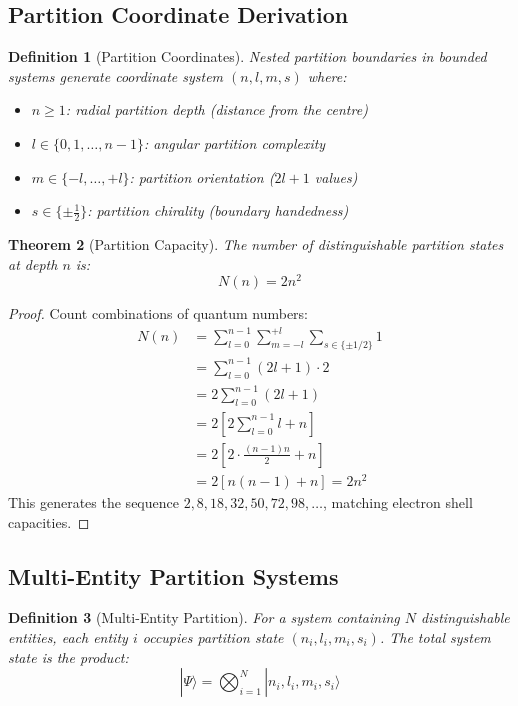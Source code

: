 \documentclass[11pt,a4paper]{article}
\newtheorem{theorem}{Theorem}[section]
\newtheorem{definition}[theorem]{Definition}
\theoremstyle{remark}
\begin{document}
\subsection{Partition Coordinate Derivation}

\begin{definition}[Partition Coordinates]
\label{def:partition_coords}
Nested partition boundaries in bounded systems generate coordinate system $(n, l, m, s)$ where:
\begin{itemize}
\item $n \geq 1$: radial partition depth (distance from the centre)
\item $l \in \{0, 1, \ldots, n-1\}$: angular partition complexity
\item $m \in \{-l, \ldots, +l\}$: partition orientation ($2l+1$ values)
\item $s \in \{\pm\frac{1}{2}\}$: partition chirality (boundary handedness)
\end{itemize}
\end{definition}

\begin{theorem}[Partition Capacity]
\label{thm:partition_capacity}
The number of distinguishable partition states at depth $n$ is:
\begin{equation}
N(n) = 2n^2
\end{equation}
\end{theorem}

\begin{proof}
Count combinations of quantum numbers:
\begin{align}
N(n) &= \sum_{l=0}^{n-1} \sum_{m=-l}^{+l} \sum_{s \in \{\pm 1/2\}} 1 \\
&= \sum_{l=0}^{n-1} (2l+1) \cdot 2 \\
&= 2\sum_{l=0}^{n-1} (2l+1) \\
&= 2\left[2\sum_{l=0}^{n-1} l + n\right] \\
&= 2\left[2 \cdot \frac{(n-1)n}{2} + n\right] \\
&= 2[n(n-1) + n] = 2n^2
\end{align}
This generates the sequence $2, 8, 18, 32, 50, 72, 98, \ldots$, matching electron shell capacities.
\end{proof}

\subsection{Multi-Entity Partition Systems}

\begin{definition}[Multi-Entity Partition]
\label{def:multi_entity}
For a system containing $N$ distinguishable entities, each entity $i$ occupies partition state $(n_i, l_i, m_i, s_i)$. The total system state is the product:
\begin{equation}
|\Psi\rangle = \bigotimes_{i=1}^N |n_i, l_i, m_i, s_i\rangle
\end{equation}
\end{definition}
\end{document}
